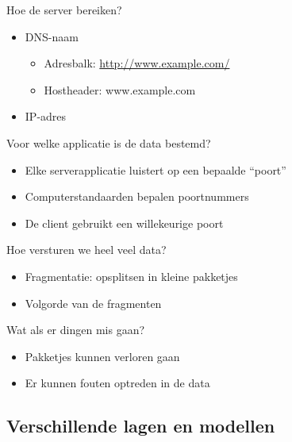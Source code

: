 


\begin{frame}{Hoe de server bereiken?}
\begin{itemize}
\item<1-> DNS-naam
    \begin{itemize}
    \item Adresbalk: \url{http://www.example.com/}
    \item Hostheader: www.example.com
    \end{itemize}
\item<2-> IP-adres
\end{itemize}
\end{frame}



\begin{frame}{Voor welke applicatie is de data bestemd?}
\begin{itemize}
\item Elke serverapplicatie luistert op een bepaalde ``poort''
\item Computerstandaarden bepalen poortnummers
\item De client gebruikt een willekeurige poort
\end{itemize}
\end{frame}



\begin{frame}{Hoe versturen we heel veel data?}
\begin{itemize}
\item Fragmentatie: opsplitsen in kleine pakketjes
\item Volgorde van de fragmenten
\end{itemize}
\end{frame}



\begin{frame}{Wat als er dingen mis gaan?}
\begin{itemize}
\item Pakketjes kunnen verloren gaan
\item Er kunnen fouten optreden in de data
\end{itemize}
\end{frame}



\subsection*{Verschillende lagen en modellen}

